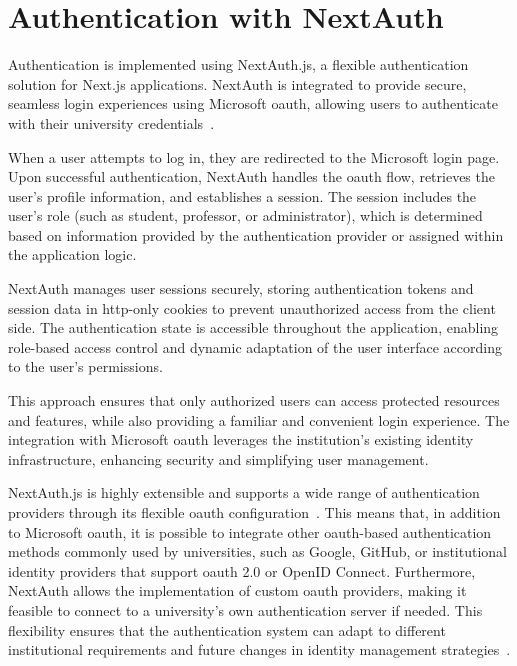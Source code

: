 \section{Authentication with NextAuth}

Authentication is implemented using NextAuth.js, a flexible authentication solution for Next.js applications. NextAuth is integrated to provide secure, seamless login experiences using Microsoft \ac{oauth}, allowing users to authenticate with their university credentials~\cite{nextjs-authentication}.

When a user attempts to log in, they are redirected to the Microsoft login page. Upon successful authentication, NextAuth handles the \ac{oauth} flow, retrieves the user's profile information, and establishes a session. The session includes the user's role (such as student, professor, or administrator), which is determined based on information provided by the authentication provider or assigned within the application logic.

NextAuth manages user sessions securely, storing authentication tokens and session data in \ac{http}-only cookies to prevent unauthorized access from the client side. The authentication state is accessible throughout the application, enabling role-based access control and dynamic adaptation of the user interface according to the user's permissions.

This approach ensures that only authorized users can access protected resources and features, while also providing a familiar and convenient login experience. The integration with Microsoft \ac{oauth} leverages the institution's existing identity infrastructure, enhancing security and simplifying user management.

NextAuth.js is highly extensible and supports a wide range of authentication providers through its flexible \ac{oauth} configuration~\cite{nextjs-authentication}. This means that, in addition to Microsoft \ac{oauth}, it is possible to integrate other \ac{oauth}-based authentication methods commonly used by universities, such as Google, GitHub, or institutional identity providers that support \ac{oauth} 2.0 or OpenID Connect. Furthermore, NextAuth allows the implementation of custom \ac{oauth} providers, making it feasible to connect to a university's own authentication server if needed. This flexibility ensures that the authentication system can adapt to different institutional requirements and future changes in identity management strategies~\cite{nextjs-authentication}.

